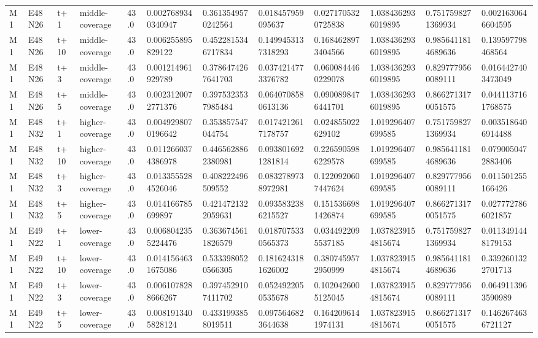 \begin{landscape}
\begin{longtable}{llllllllllll}
M1 & E48N26 & t+1 & middle-coverage & 43.0 & 0.0027689340340947 & 0.3613549570242564 & 0.018457959095637 & 0.0271705320725838 & 1.0384362936019895 & 0.7517598271369934 & 0.0021630646604595 \\
M1 & E48N26 & t+10 & middle-coverage & 43.0 & 0.006255895829122 & 0.4522815346717834 & 0.1499453137318293 & 0.1684628973404566 & 1.0384362936019895 & 0.9856411814689636 & 0.139597798468564 \\
M1 & E48N26 & t+3 & middle-coverage & 43.0 & 0.001214961929789 & 0.3786474267641703 & 0.0374214773376782 & 0.0600844460229078 & 1.0384362936019895 & 0.8297779560089111 & 0.0164427403473049 \\
M1 & E48N26 & t+5 & middle-coverage & 43.0 & 0.0023120072771376 & 0.3975323537985484 & 0.0640708580613136 & 0.0900898476441701 & 1.0384362936019895 & 0.8662713170051575 & 0.0441137161768575 \\
M1 & E48N32 & t+1 & higher-coverage & 43.0 & 0.0049298070196642 & 0.353857547044754 & 0.0174212617178757 & 0.024855022629102 & 1.019296407699585 & 0.7517598271369934 & 0.0035186406914488 \\
M1 & E48N32 & t+10 & higher-coverage & 43.0 & 0.0112660374386978 & 0.4465628862380981 & 0.0938016921281814 & 0.2265905986229578 & 1.019296407699585 & 0.9856411814689636 & 0.0790050472883406 \\
M1 & E48N32 & t+3 & higher-coverage & 43.0 & 0.0133555284526046 & 0.408222496509552 & 0.0832789738972981 & 0.1220920607447624 & 1.019296407699585 & 0.8297779560089111 & 0.011501255166426 \\
M1 & E48N32 & t+5 & higher-coverage & 43.0 & 0.014166785699897 & 0.4214721322059631 & 0.0935832386215527 & 0.1515366981426874 & 1.019296407699585 & 0.8662713170051575 & 0.0277727866021857 \\
M1 & E49N22 & t+1 & lower-coverage & 43.0 & 0.0068042355224476 & 0.3636745611826579 & 0.0187075330565373 & 0.0344922095537185 & 1.0378239154815674 & 0.7517598271369934 & 0.0113491448179153 \\
M1 & E49N22 & t+10 & lower-coverage & 43.0 & 0.0141564631675086 & 0.5333980520566305 & 0.1816243181626002 & 0.3807459572950999 & 1.0378239154815674 & 0.9856411814689636 & 0.3392601322701713 \\
M1 & E49N22 & t+3 & lower-coverage & 43.0 & 0.0061078288666267 & 0.3974529107411702 & 0.0524922050535678 & 0.1020426005125045 & 1.0378239154815674 & 0.8297779560089111 & 0.0649113963590989 \\
M1 & E49N22 & t+5 & lower-coverage & 43.0 & 0.0081913405828124 & 0.4331993858019511 & 0.0975646823644638 & 0.1642096141974131 & 1.0378239154815674 & 0.8662713170051575 & 0.1462674636721127 \\

\end{longtable}
\end{landscape}
